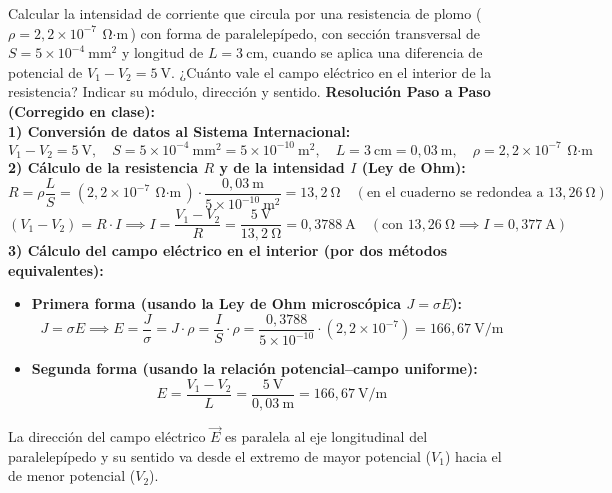\begin{ejercicio}
Calcular la intensidad de corriente que circula por una resistencia de plomo ($\rho = 2{,}2 \times 10^{-7}\ \si{\ohm\cdot\meter}$) con forma de paralelepípedo, con sección transversal de $S = 5 \times 10^{-4}\ \si{\milli\meter\squared}$ y longitud de $L = 3\ \si{\centi\meter}$, cuando se aplica una diferencia de potencial de $V_1 - V_2 = 5\ \si{\volt}$. ¿Cuánto vale el campo eléctrico en el interior de la resistencia? Indicar su módulo, dirección y sentido.
\tcbline
\textbf{Resolución Paso a Paso (Corregido en clase):}\\[4pt]
\textbf{1) Conversión de datos al Sistema Internacional:}
\begin{equation}
    V_1 - V_2 = 5\ \si{\volt}, \quad S = 5 \times 10^{-4}\ \si{\milli\meter\squared} = 5 \times 10^{-10}\ \si{\meter\squared}, \quad L = 3\ \si{\centi\meter} = 0{,}03\ \si{\meter}, \quad \rho = 2{,}2 \times 10^{-7}\ \si{\ohm\cdot\meter}
\end{equation}
\textbf{2) Cálculo de la resistencia $R$ y de la intensidad $I$ (Ley de Ohm):}
\begin{equation}
    R = \rho \frac{L}{S} = (2{,}2 \times 10^{-7}\ \si{\ohm\cdot\meter}) \cdot \frac{0{,}03\ \si{\meter}}{5 \times 10^{-10}\ \si{\meter\squared}} = 13{,}2\ \si{\ohm}\quad (\text{en el cuaderno se redondea a } 13{,}26\ \si{\ohm})
\end{equation}
\begin{equation}
    (V_1 - V_2) = R \cdot I \implies I = \frac{V_1 - V_2}{R} = \frac{5\ \si{\volt}}{13{,}2\ \si{\ohm}} = 0{,}3788\ \si{\ampere}\quad \left(\text{con } 13{,}26\ \si{\ohm} \implies I = 0{,}377\ \si{\ampere}\right)
\end{equation}
\textbf{3) Cálculo del campo eléctrico en el interior (por dos métodos equivalentes):}
\begin{itemize}[leftmargin=*]
    \item \textbf{Primera forma (usando la Ley de Ohm microscópica $J = \sigma E$):}
    \begin{equation}
        J = \sigma E \implies E = \frac{J}{\sigma} = J \cdot \rho = \frac{I}{S} \cdot \rho = \frac{0{,}3788}{5 \times 10^{-10}} \cdot (2{,}2 \times 10^{-7}) = 166{,}67\ \si{\volt\per\meter}
    \end{equation}
    \item \textbf{Segunda forma (usando la relación potencial--campo uniforme):}
    \begin{equation}
        E = \frac{V_1 - V_2}{L} = \frac{5\ \si{\volt}}{0{,}03\ \si{\meter}} = 166{,}67\ \si{\volt\per\meter}
    \end{equation}
\end{itemize}
La dirección del campo eléctrico $\vec{E}$ es paralela al eje longitudinal del paralelepípedo y su sentido va desde el extremo de mayor potencial ($V_1$) hacia el de menor potencial ($V_2$).
\end{ejercicio}

